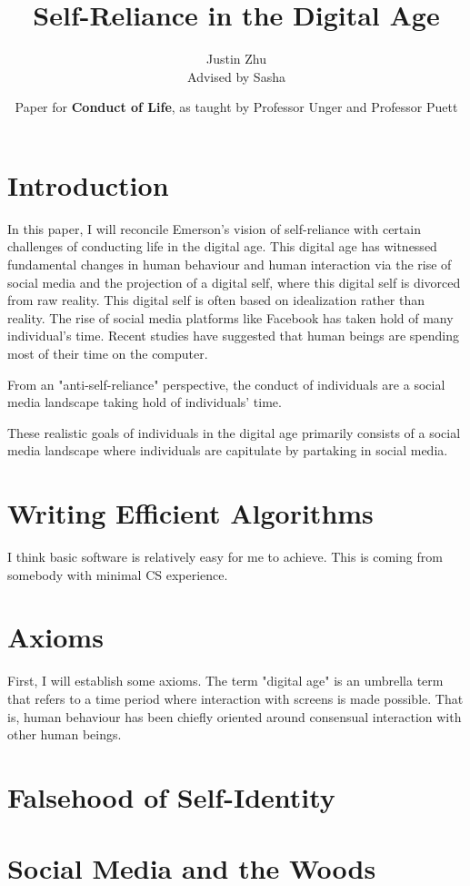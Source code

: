 \documentclass[12pt,letterpaper]{article}
\author{Justin Zhu \\ Advised by Sasha}
\title{Self-Reliance in the Digital Age}
\date{Paper for \textbf{Conduct of Life}, as taught by Professor Unger and Professor Puett}
\begin{document}
\maketitle

\section{Introduction}
In this paper, I will reconcile Emerson's vision of
self-reliance with certain challenges of conducting life in the digital age.
This digital age has witnessed fundamental changes
in human behaviour and human interaction via the rise of
social media and the projection of a digital self, where
this digital self is divorced from raw reality.  This
digital self is often based on idealization rather than
reality.  The rise
of social media platforms like Facebook has taken hold of
many individual's time.  Recent studies have suggested that
human beings are spending most of their time on the
computer.

From an "anti-self-reliance" perspective, the conduct of individuals are a
social media landscape taking hold of individuals' time.

These realistic goals of individuals in the
digital age primarily consists of a social media landscape
where individuals are capitulate by partaking in social
media.  


\section{Writing Efficient Algorithms}
I think basic software is relatively easy for me to achieve.
This is coming from somebody with minimal CS experience.

\section{Axioms}
First, I will establish some axioms.  The term "digital
age" is an umbrella term that refers to a time period
where interaction with screens is made possible.  That is,
human behaviour has been chiefly oriented around consensual
interaction with other human beings.

\section{Falsehood of Self-Identity}

\section{Social Media and the Woods}
\end{document}
